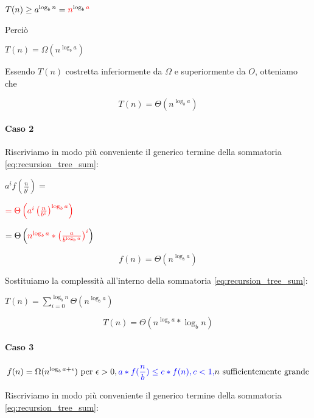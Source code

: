 $T(n) \geq a^{\log_b{n}} = \textcolor{red}{n}^{\log_b{\textcolor{red}{a}}}$

Perciò 

$T(n) = \Omega(n^{\log_b{a}})$

Essendo $T(n)$ costretta inferiormente da $\Omega$ e superiormente da $O$, otteniamo che

\begin{equation}
T(n) = \Theta(n^{\log_b{a}})
\end{equation}

\paragraph{Caso 2}

Riscriviamo in modo più conveniente il generico termine della sommatoria \ref{eq:recursion_tree_sum}:

$a^if\left(\frac{n}{b^i}\right)=$

$\textcolor{red}{=\Theta\left(a^i\left(\frac{n}{b^i}\right)^{\log_b{a}}\right)}$

$=\Theta\left(\textcolor{red}{n^{\log_b{a}} * \left( \frac{a}{b^{\log_b{a}}} \right)^i} \right)$

\begin{equation}
f(n) = \Theta(n^{\log_b{a}})
\end{equation}

Sostituiamo la complessità all'interno della sommatoria \ref{eq:recursion_tree_sum}:

$T(n) = \sum_{i=0}^{\log_b{n}}{\Theta(n^{\log_b{a}})}$

\begin{equation}
T(n) = \Theta(n^{\log_b{a}}*\log_b{n})
\end{equation}

\paragraph{Caso 3}

\begin{equation}
f(n) = \Omega(n^{\log_b{a} + \epsilon})  \mbox{ per } \epsilon > 0, \\ 
\textcolor{blue}{a*f(\frac{n}{b}) \leq c*f(n), \\ 
c < 1,} \\
n \mbox{ sufficientemente grande}
\end{equation}

Riscriviamo in modo più conveniente il generico termine della sommatoria \ref{eq:recursion_tree_sum}:

